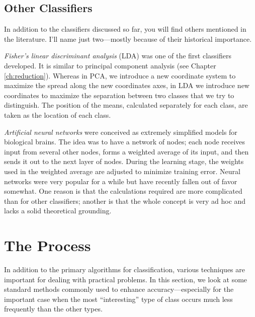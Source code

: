 
\subsection{Other Classifiers}

In addition to the classifiers discussed so far, you will find others
mentioned in the literature. I'll name just two---mostly because of
their historical importance.

\emph{Fisher's linear discriminant analysis} (LDA) was one of the
first classifiers developed. It is similar to principal component
analysis (see Chapter \ref{ch:reduction}). Whereas in PCA, we introduce
a new coordinate system to maximize  the spread along the new
coordinates axes, in LDA we introduce new coordinates to maximize the
separation between two classes that we try to distinguish. The
position of the means, calculated separately for each class, are taken
as the location of each class.

\emph{Artificial neural networks} were conceived as extremely
simplified models for biological brains. The idea was to have a
network of nodes; each node receives input from several other nodes,
forms a weighted average of its input, and then sends it out to the
next layer of nodes.  During the learning stage, the weights used in
the weighted average are adjusted to minimize training error.  Neural
networks were very popular for a while but have recently fallen out
of favor somewhat. One reason is that the\vadjust{\pagebreak} calculations required are
more complicated than for other classifiers; another is that the whole
concept is very ad hoc and lacks a solid theoretical grounding.


 
\section{The Process}

In addition to the primary algorithms for classification, various
techniques are important for dealing with practical problems. In this
section, we look at some standard methods commonly used to enhance
accuracy---especially for the important case when the most
``interesting'' type of class occurs much less frequently than the
other types. 


